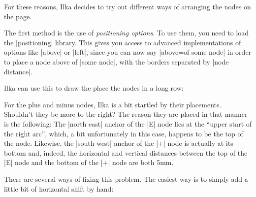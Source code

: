 For these reasons, Ilka decides to try out different ways of arranging the
nodes on the page.

The first method is the use of \emph{positioning options}. To use them, you
need to load the |positioning| library. This gives you access to advanced
implementations of options like |above| or |left|, since you can now say
|above=of some node| in order to place a node above of |some node|, with the
borders separated by |node distance|.

Ilka can use this to draw the place the nodes in a long row:
%
\begin{codeexample}[libraries/tikz={positioning,shapes.misc}]
\end{codeexample}

For the plus and minus nodes, Ilka is a bit startled by their placements.
Shouldn't they be more to the right? The reason they are placed in that manner
is the following: The |north east| anchor of the |E| node lies at the ``upper
start of the right arc'', which, a bit unfortunately in this case, happens to
be the top of the node. Likewise, the |south west| anchor of the |+| node is
actually at its bottom and, indeed, the horizontal and vertical distances
between the top of the |E| node and the bottom of the |+| node are both 5mm.

There are several ways of fixing this problem. The easiest way is to simply add
a little bit of horizontal shift by hand:
%
\begin{codeexample}[libraries/tikz={positioning,shapes.misc}]
\end{codeexample}

